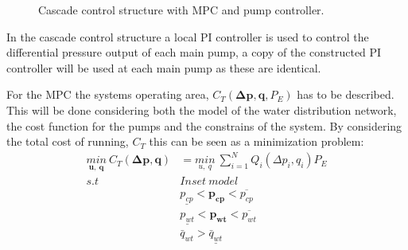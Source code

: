 \begin{figure}[H]
\centering
 
\caption{Cascade control structure with MPC and pump controller.}
\label{fig:control_structure}
\end{figure}

In the cascade control structure a local PI controller is used to control the differential pressure output of each main pump, a copy of the constructed PI controller will be used at each main pump as these are identical.

For the MPC the systems operating area, $C_T(\pmb{\Delta{p}},\pmb{q},P_E)$ has to be described. This will be done considering both the model of the water distribution network, the cost function for the pumps and the constrains of the system. By considering the total cost of running, $C_T$ this can be seen as a minimization problem:
\begin{align*}
\underset{\pmb{u}, \:\pmb{q}}{min} \: C_T(\pmb{\Delta{p}},\pmb{q}) &= \underset{u, \:q}{min} \: \sum_{i=1}^{N} Q_i(\Delta{p}_i,q_i) P_E  \\
%
s.t \:\:\:\:\: & Inset \:model \\
%
& \underline{p_{cp}} < \pmb{p_{cp}} < \overline{p_{cp}} \\
%
& \underline{p_{wt}} < \pmb{p_{wt}} < \overline{p_{wt}} \\
%
& \bar{q}_{wt} > \underline{\bar{q}_{wt}}
\end{align*}

